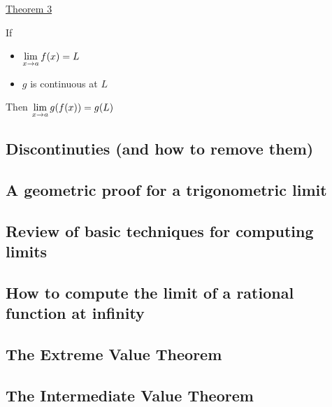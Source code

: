 \begin{mdframed}
  \underline{Theorem 3}

  If
  \begin{itemize}
    \item \(\displaystyle \lim_{x \to a} f(x) = L\)
    \item \(g\) is continuous at \(L\)
  \end{itemize}

  Then \(\displaystyle \lim_{x \to a} g(f(x)) = g(L)\)
\end{mdframed}

\subsection{Discontinuties (and how to remove them)}
\subsection{A geometric proof for a trigonometric limit}
\subsection{Review of basic techniques for computing limits}
\subsection{How to compute the limit of a rational function at infinity}
\subsection{The Extreme Value Theorem}
\subsection{The Intermediate Value Theorem}
